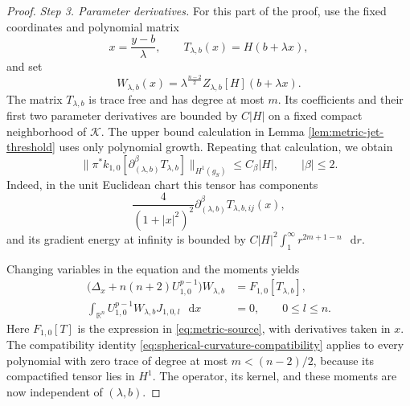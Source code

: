 \documentclass[11pt]{article}
\numberwithin{equation}{section}
\theoremstyle{remark}
\newcommand{\R}{\mathbb R}
\newcommand{\dd}{\mathop{}\!\mathrm{d}}
\begin{document}
\begin{proof}
\emph{Step 3. Parameter derivatives.}
For this part of the proof, use the fixed coordinates and polynomial
matrix
\[
 x=\frac{y-b}{\lambda},\qquad
 T_{\lambda,b}(x)=H(b+\lambda x),
\]
and set
\[
 W_{\lambda,b}(x)
 =\lambda^{\frac{n-2}{2}}Z_{\lambda,b}[H](b+\lambda x).
\]
The matrix \(T_{\lambda,b}\) is trace free and has degree at most \(m\).
Its coefficients and their first two parameter derivatives are bounded
by \(C|H|\) on a fixed compact neighborhood of \(\mathcal K\).
The upper bound calculation in Lemma  \ref{lem:metric-jet-threshold}
uses only polynomial growth. {Repeating that calculation, we
obtain}
\[
 \bigl\|\pi^*k_{1,0}[\partial_{(\lambda,b)}^\beta T_{\lambda,b}]
 \bigr\|_{H^1(g_{S})}
 \le C_\beta|H|,\qquad |\beta|\le2.
\]
Indeed, in the unit Euclidean chart this tensor has components
\[
 \frac4{(1+|x|^2)^2}
 \partial_{(\lambda,b)}^\beta T_{\lambda,b,ij}(x),
\]
and its gradient energy at infinity is bounded by
\(C|H|^2\int_1^\infty r^{2m+1-n}\,\dd r\).

Changing variables in the equation and the moments yields
 {
\[
 \begin{aligned}
 \bigl(\Delta_x+n(n+2)U_{1,0}^{p-1}\bigr)W_{\lambda,b}
 &=F_{1,0}[T_{\lambda,b}],\\
 \int_{\R^n}U_{1,0}^{p-1}W_{\lambda,b}J_{1,0,l}\,\dd x&=0,
 \qquad 0\le l\le n.
 \end{aligned}
\]
}
Here \(F_{1,0}[T]\) is the expression in \eqref{eq:metric-source},
with derivatives taken in \(x\).
The compatibility identity
\eqref{eq:spherical-curvature-compatibility} applies to every polynomial with zero trace of degree at most \(m<(n-2)/2\), because its
compactified tensor lies in \(H^1\). The operator, its kernel, and
these moments are now independent of \((\lambda,b)\).


\end{proof}
\end{document}
